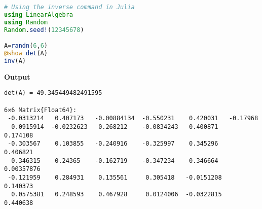 
\begin{lstlisting}[language=Julia,style=mystyle]
# Using the inverse command in Julia
using LinearAlgebra    
using Random
Random.seed!(12345678)

A=randn(6,6)
@show det(A)
inv(A)
\end{lstlisting}
\textbf{Output}
\begin{verbatim}
det(A) = 49.345449482491595

6×6 Matrix{Float64}:
 -0.0313214   0.407173   -0.00884134  -0.550231    0.420031   -0.17968
  0.0915914  -0.0232623   0.268212    -0.0834243   0.400871    0.174108
 -0.303567    0.103855   -0.240916    -0.325997    0.345296    0.406821
  0.346315    0.24365    -0.162719    -0.347234    0.346664    0.00357876
 -0.121959    0.284931    0.135561     0.305418   -0.0151208   0.140373
  0.0575381   0.248593    0.467928     0.0124006  -0.0322815   0.440638
\end{verbatim}
   



